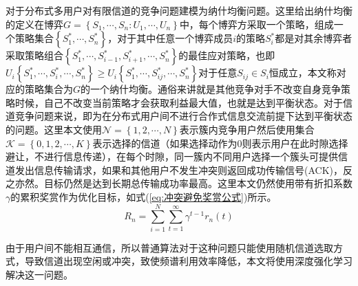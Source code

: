 对于分布式多用户对有限信道的竞争问题建模为纳什均衡问题。这里给出纳什均衡的定义在博弈$ G=\left \{ S_{1},\cdots,S_{n}:U_{1},\cdots,U_{n}\right \}  $中，每个博弈方采取一个策略，组成一个策略集合$\left\{S_{1}^{*},\cdots,S_{n}^{*}\right\}$，对于其中任意一个博弈成员$i$的策略$S_{i}^{*}$都是对其余博弈者采取策略组合$\left\{S_{1}^{*},\cdots,S_{i-1}^{*},S_{i+1}^{*},\cdots,S_{n}^{*}\right\}$的最佳应对策略，也即$U_{i}\left \{ S_{1}^{*}, \cdots ,S_{i}^{*},\cdots,S_{n}^{*} \right \}\geqslant U_{i}\left \{ S_{1}^{*},\cdots ,S_{ij}^{*},\cdots,S_{n}^{*} \right \}$对于任意$S_{ij}\in S_{i}$恒成立，本文称对应的策略集合为$G$的一个纳什均衡。通俗来讲就是其他竞争对手不改变自身竞争策略时候，自己不改变当前策略才会获取利益最大值，也就是达到平衡状态。对于信道竞争问题来说，即为在分布式用户间不进行合作式信息交流前提下达到平衡状态的问题。这里本文使用$\mathcal{N}=\left \{ 1,2,\cdots,N \right \}$表示簇内竞争用户然后使用集合$\mathcal{K}=\left \{0,1,2,\cdots,K \right \}$表示选择的信道（如果选择动作为0则表示用户在此时隙选择避让，不进行信息传递），在每个时隙，同一簇内不同用户选择一个簇头可提供信道发出信息传输请求，如果和其他用户不发生冲突则返回成功传输信号(ACK)，反之亦然。目标仍然是达到长期总传输成功率最高。这里本文仍然使用带有折扣系数$\gamma$的累积奖赏作为优化目标，如式(\ref{eq:冲突避免奖赏公式})所示。
\begin{equation}\label{eq:冲突避免奖赏公式}
R_{n}=\sum_{i=1}^{N}\sum_{t=1}^{\infty }\gamma ^{t-1}r_{n}\left ( t \right )
\end{equation}

由于用户间不能相互通信，所以普通算法对于这种问题只能使用随机信道选取方式，导致信道出现空闲或冲突，致使频谱利用效率降低，本文将使用深度强化学习解决这一问题。

